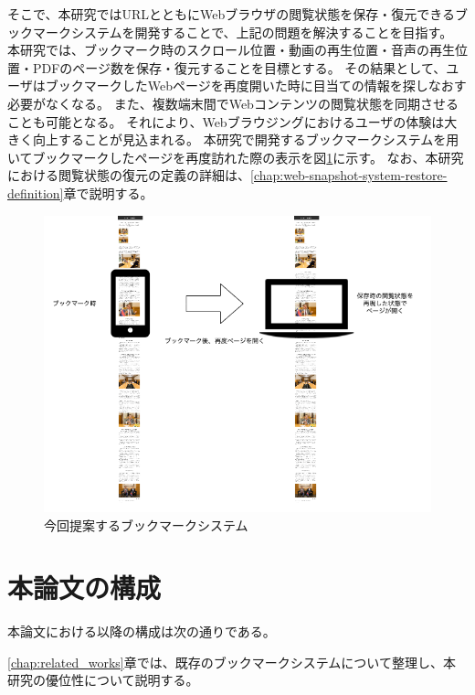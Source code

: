 そこで、本研究ではURLとともにWebブラウザの閲覧状態を保存・復元できるブックマークシステムを開発することで、上記の問題を解決することを目指す。
本研究では、ブックマーク時のスクロール位置・動画の再生位置・音声の再生位置・PDFのページ数を保存・復元することを目標とする。
その結果として、ユーザはブックマークしたWebページを再度開いた時に目当ての情報を探しなおす必要がなくなる。
また、複数端末間でWebコンテンツの閲覧状態を同期させることも可能となる。
それにより、Webブラウジングにおけるユーザの体験は大きく向上することが見込まれる。
本研究で開発するブックマークシステムを用いてブックマークしたページを再度訪れた際の表示を図\ref{fig:ideal-scroll-position}に示す。
なお、本研究における閲覧状態の復元の定義の詳細は、\ref{chap:web-snapshot-system-restore-definition}章で説明する。

\begin{figure}[htbp]
  \caption{今回提案するブックマークシステム}
  \label{fig:ideal-scroll-position}
  \begin{center}
    \includegraphics[bb=0 0 681 641,width=15cm]{img/010_introduction/ideal-scroll-position.pdf}
  \end{center}
\end{figure}

\section{本論文の構成}

本論文における以降の構成は次の通りである。

\ref{chap:related_works}章では、既存のブックマークシステムについて整理し、本研究の優位性について説明する。

